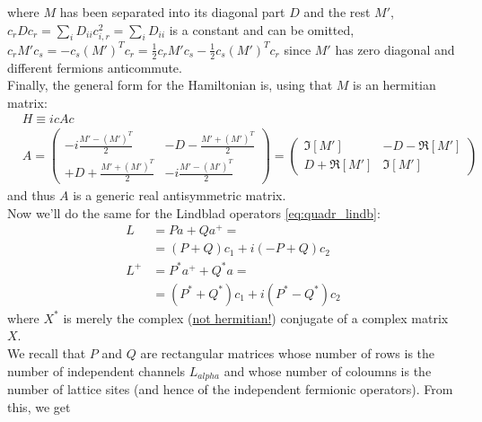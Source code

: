 \documentclass[a4paper,11pt]{article}
\newcommand{\ubar}[1]{\underline{#1}}
\begin{document}
   where $M$ has been separated into its diagonal part $D$ and the rest $\displaystyle M'$, $c_rDc_r = \sum_iD_{ii}c_{i,r}^2 = \sum_i D_{ii}$ is a constant and can be omitted, $\displaystyle c_rM'c_s = - c_s(M')^Tc_r = \frac{1}{2}c_rM'c_s - \frac{1}{2}c_s(M')^Tc_r$ since $M'$ has zero diagonal and different fermions anticommute.\\ Finally, the general form for the Hamiltonian is, using that $M$ is an hermitian matrix:
    \begin{subequations}
    \label{eq:quadr_ham_majorana}
    \begin{align}
     & H \equiv icAc\\
     & A = \left(
     \begin{array}{cc}
       -i\frac{M'-(M')^T}{2} & -D - \frac{M'+(M')^T}{2} \\
       + D + \frac{M'+(M')^T}{2} & -i \frac{M'-(M')^T}{2}
        \end{array}
        \right)
      =\left( 
      \begin{array}{cc}
        \Im[M'] & -D-\Re[M']\\
        D+\Re[M'] & \Im[M']
        \end{array}
        \right)
    \end{align}
\end{subequations}
and thus $A$ is a generic real antisymmetric matrix.\\[0.3cm] Now we'll do the same for the Lindblad operators \ref{eq:quadr_lindb}:
\begin{align*}
 L &= P a + Q a^+=\\
   &= (P+Q)c_1 +i(-P+Q)c_2\\
 L^+&= P^*a^++Q^*a=\\
   &= (P^*+Q^*)c_1+i(P^*-Q^*)c_2  
\end{align*} 
where $X^*$ is merely the complex (\ubar{not hermitian!}) conjugate of a complex matrix $X$. \\We recall that $P$ and $Q$ are rectangular matrices whose number of rows is the number of independent channels $L_{alpha}$ and whose number of coloumns is the number of lattice sites (and hence of the independent fermionic operators). From this, we get
\end{document}
